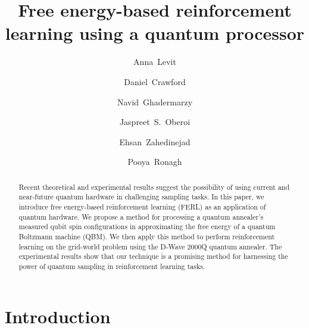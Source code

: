 \documentclass[pra,twocolumn,floatfix,superscriptaddress]{revtex4}
\begin{document}
\title{Free energy-based reinforcement learning using a quantum processor}

\author{Anna~Levit}
\author{Daniel~Crawford}
\author{Navid~Ghadermarzy}
\author{Jaspreet~S.~Oberoi}
\author{Ehsan~Zahedinejad}
\author{Pooya~Ronagh}
%

\begin{abstract}
Recent theoretical and experimental results suggest the possibility of using current and near-future quantum hardware in challenging sampling tasks. In this paper, we introduce free energy-based reinforcement learning (FERL) as an        application of quantum hardware. We propose a method for processing a quantum annealer's measured qubit spin configurations in approximating the free energy of a quantum Boltzmann machine (QBM). We then apply this method to perform reinforcement learning on the grid-world problem  
using the D-Wave 2000Q quantum annealer. The experimental results show that our technique is a promising method for harnessing the power of quantum sampling in reinforcement learning tasks.   
\end{abstract}

\maketitle

\section{Introduction} 
\end{document}
